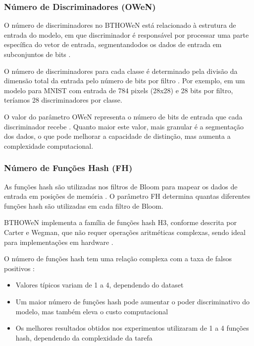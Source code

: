 \documentclass{article}
\begin{document}
\subsubsection{Número de Discriminadores (OWeN)}

O número de discriminadores no BTHOWeN está relacionado à estrutura de entrada do modelo, em que discriminador é responsável por processar uma parte específica do vetor de entrada, segmentandodos os dados de entrada em subconjuntos de bits \cite{lima2020wisardpkg, santiago2020}. 

O número de discriminadores para cada classe é determinado pela divisão da dimensão total da entrada pelo número de bits por filtro \cite{santiago2020}. Por exemplo, em um modelo para MNIST com entrada de 784 pixels (28x28) e 28 bits por filtro, teríamos 28 discriminadores por classe.

O valor do parâmetro OWeN representa o número de bits de entrada que cada discriminador recebe \cite{santiago2020, susskind2022}. Quanto maior este valor, mais granular é a segmentação dos dados, o que pode melhorar a capacidade de distinção, mas aumenta a complexidade computacional.

\subsubsection{Número de Funções Hash (FH)}

As funções hash são utilizadas nos filtros de Bloom para mapear os dados de entrada em posições de memória \cite{santiago2020}. O parâmetro FH determina quantas diferentes funções hash são utilizadas em cada filtro de Bloom.

BTHOWeN implementa a família de funções hash H3, conforme descrita por Carter e Wegman, que não requer operações aritméticas complexas, sendo ideal para implementações em hardware \cite{susskind2022}.

O número de funções hash tem uma relação complexa com a taxa de falsos positivos \cite{santiago2020}:
\begin{itemize}
    \item Valores típicos variam de 1 a 4, dependendo do dataset
    \item Um maior número de funções hash pode aumentar o poder discriminativo do modelo, mas também eleva o custo computacional
    \item Os melhores resultados obtidos nos experimentos utilizaram de 1 a 4 funções hash, dependendo da complexidade da tarefa
\end{itemize}
\end{document}
